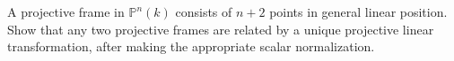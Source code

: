 \begin{problem}\label{chal:vi36-01}
A projective frame in \(\mathbb P^n(k)\) consists of \(n+2\) points in general linear position.  Show that any two projective frames are related by a unique projective linear transformation, after making the appropriate scalar normalization.
\end{problem}
